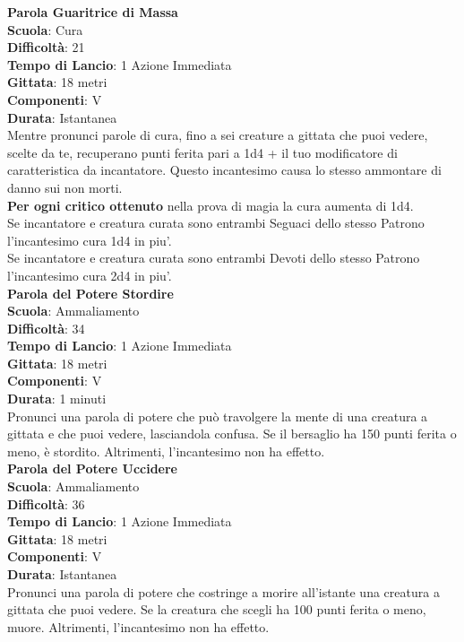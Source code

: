 \begin{multicols}{2}
\medskip\textbf{Parola Guaritrice di Massa}\\
\textbf{Scuola}: Cura\\
\textbf{Difficoltà}: 21\\
\textbf{Tempo di Lancio}: 1 Azione Immediata\\
\textbf{Gittata}: 18 metri\\
\textbf{Componenti}: V\\
\textbf{Durata}: Istantanea\\
Mentre pronunci parole di cura, fino a sei creature a gittata che puoi vedere, scelte da te, recuperano punti ferita pari a 1d4 + il tuo modificatore di caratteristica da incantatore. Questo incantesimo causa lo stesso ammontare di danno sui non morti.\\
\textbf{Per ogni critico ottenuto} nella prova di magia la cura aumenta di 1d4.\\
Se incantatore e creatura curata sono entrambi Seguaci dello stesso Patrono l'incantesimo cura 1d4 in piu'.\\
Se incantatore e creatura curata sono entrambi Devoti dello stesso Patrono l'incantesimo cura 2d4 in piu'.\\
 
\medskip\textbf{Parola del Potere Stordire}\\
\textbf{Scuola}: Ammaliamento\\
\textbf{Difficoltà}: 34\\
\textbf{Tempo di Lancio}: 1 Azione Immediata\\
\textbf{Gittata}: 18 metri\\
\textbf{Componenti}: V\\
\textbf{Durata}: 1 minuti\\
Pronunci una parola di potere che può travolgere la mente di una creatura a gittata e che puoi vedere, lasciandola confusa. Se il bersaglio ha 150 punti ferita o meno, è stordito. Altrimenti, l'incantesimo non ha effetto.\\

\medskip\textbf{Parola del Potere Uccidere}\\
\textbf{Scuola}: Ammaliamento\\
\textbf{Difficoltà}: 36\\
\textbf{Tempo di Lancio}: 1 Azione Immediata\\
\textbf{Gittata}: 18 metri\\
\textbf{Componenti}: V\\
\textbf{Durata}: Istantanea\\
Pronunci una parola di potere che costringe a morire all'istante una creatura a gittata che puoi vedere. Se la creatura che scegli ha 100 punti ferita o meno, muore. Altrimenti, l'incantesimo non ha effetto. 


\end{multicols}
